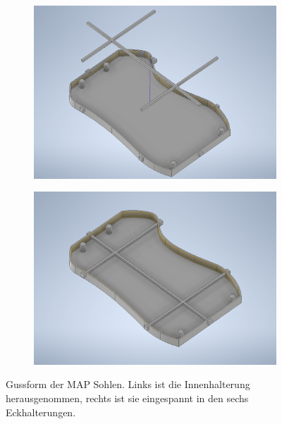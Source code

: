 \begin{figure}[b]
	\hfill
	\begin{subfigure}[c]{.49\linewidth}
		\centering
		\includegraphics[width=\linewidth]{Bilder/Gussform_Innenteil_verschoben.png}
	\end{subfigure}
	\begin{subfigure}[c]{.49\linewidth}
		\centering
		\includegraphics[width=\linewidth]{Bilder/Gussform.png}		
	\end{subfigure}
	\hfill
	\caption{Gussform der MAP Sohlen. Links ist die Innenhalterung herausgenommen, rechts ist sie eingespannt in den sechs Eckhalterungen.}
	\label{Gussform_Inventor}
\end{figure}

